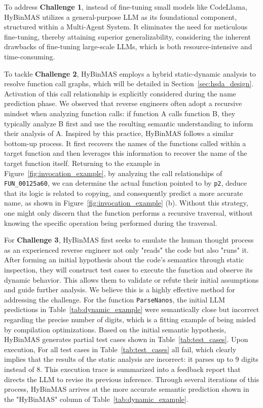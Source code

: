 \documentclass[acmsmall,screen,review,anonymous]{acmart} %
\begin{document}
To address \textbf{Challenge 1}, instead of fine-tuning small models like CodeLlama, HyBinMAS utilizes a general-purpose LLM as its foundational component, structured within a Multi-Agent System. It eliminates the need for meticulous fine-tuning, thereby attaining superior generalizability, considering the inherent drawbacks of fine-tuning large-scale LLMs, which is both resource-intensive and time-consuming\cite{LLaMA}.

To tackle \textbf{Challenge 2}, HyBinMAS employs a hybrid static-dynamic analysis to resolve function call graphs, which will be detailed in Section~\ref{sec:hsda_design}. Activation of this call relationship is explicitly considered during the name prediction phase. We observed that reverse engineers often adopt a recursive mindset when analyzing function calls: if function A calls function B, they typically analyze B first and use the resulting semantic understanding to inform their analysis of A. Inspired by this practice, HyBinMAS follows a similar bottom-up process. It first recovers the names of the functions called within a target function and then leverages this information to recover the name of the target function itself. Returning to the example in Figure~\ref{fig:invocation_example}, by analyzing the call relationships of \lstinline{FUN_00125a60}, we can determine the actual function pointed to by \lstinline{p2}, deduce that its logic is related to copying, and consequently predict a more accurate name, as shown in Figure~\ref{fig:invocation_example} (b). Without this strategy, one might only discern that the function performs a recursive traversal, without knowing the specific operation being performed during the traversal.

For \textbf{Challenge 3}, HyBinMAS first seeks to emulate the human thought process as an experienced reverse engineer not only "reads" the code but also "runs" it. After forming an initial hypothesis about the code's semantics through static inspection, they will construct test cases to execute the function and observe its dynamic behavior. This allows them to validate or refute their initial assumptions and guide further analysis. We believe this is a highly effective method for addressing the challenge. For the function \lstinline{ParseNanos}, the initial LLM predictions in Table~\ref{tab:dynamic_example} were semantically close but incorrect regarding the precise number of digits, which is a fitting example of being misled by compilation optimizations. Based on the initial semantic hypothesis, HyBinMAS generates partial test cases shown in Table~\ref{tab:test_cases}. Upon execution, For all test cases in Table~\ref{tab:test_cases} all fail, which clearly implies that the results of the static analysis are incorrect: it parses up to 9 digits instead of 8. This execution trace is summarized into a feedback report that directs the LLM to revise its previous inference. Through several iterations of this process, HyBinMAS arrives at the more accurate semantic prediction shown in the "HyBinMAS" column of Table~\ref{tab:dynamic_example}.
\end{document}
